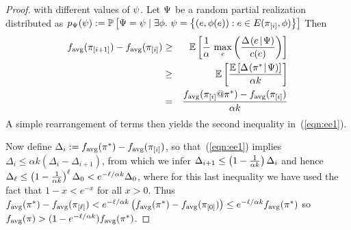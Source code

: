\begin{proof}
with different values of ${\color{black}{\ensuremath{\psi}}}$.
%
Let ${\color{black}{\ensuremath{\Psi}}}$ be a random partial realization distributed as 
${\color{black}{\ensuremath{p_{{\color{black}{\ensuremath{\Psi}}}}\! \left( {{\color{black}{\ensuremath{\psi}}}} \right) }}} := \mathbb{P}\left[{\color{black}{\ensuremath{\Psi}}} = {\color{black}{\ensuremath{\psi}}} \mid \exists {\color{black}{\ensuremath{\phi}}}.\ {\color{black}{\ensuremath{\psi}}} = \left\{(e, {\color{black}{\ensuremath{\phi}}}(e)) : e \in E({ \pi_{[{i}]} }, {{\color{black}{\ensuremath{\phi}}}})\right\}\right] $
%
%
Then 
%
\begin{eqnarray*}
  f_{\text{avg}}( \pi_{[{i+1}]} ) -  f_{\text{avg}}( \pi_{[{i}]} ) & \ge & \mathbb{E}\left[ \frac{1}{\alpha}\,\max_{e}
 \left( {\frac{\Delta \hspace{-0.3mm} \left( { {e}\! \mid \! {{\color{black}{\ensuremath{\Psi}}}} } \right)  }{c(e)}} \right)  \right] \\
 &  \ge & \mathbb{E}\left[
\frac{\mathbb{E}\left[\Delta \hspace{-0.3mm} \left( { {\pi^*}\! \mid \! {{\color{black}{\ensuremath{\Psi}}}} } \right)  \right]}{\alpha k} \right]\\
  & = & \frac{ f_{\text{avg}}(
    { \pi_{[{i}]} }@{\pi^*})  -
    f_{\text{avg}}( \pi_{[{i}]} )} {\alpha k} 
\end{eqnarray*}
%
%
%
%
%
%
%
%
%
%
%
%
%
%
%
\noindent
A simple rearrangement of terms then yields the second inequality in~(\ref{eqn:ee1}).

%
%
%
%
%
%
%




Now define $\Delta_i := f_{\text{avg}}(\pi^*) - f_{\text{avg}}( \pi_{[{i}]} )$,
so that~(\ref{eqn:ee1}) implies $\Delta_i \le \alpha k(\Delta_i
  - \Delta_{i+1})$, from which we infer
  $\Delta_{i+1} \le  \left( {1-\frac{1}{\alpha k}} \right) \Delta_{i}$ and hence 
$\Delta_{\ell} \le  \left( {1 - \frac{1}{\alpha k}} \right) ^{\ell} \Delta_0 <
e^{-\ell/\alpha k} \Delta_0$, where for this last inequality we have used
the fact that $1 - x < e^{-x}$ for all
$x > 0$.
Thus 
$f_{\text{avg}}(\pi^*) - f_{\text{avg}}( \pi_{[{\ell}]} ) < e^{-\ell/\alpha k}  \left( {f_{\text{avg}}(\pi^*) -
  f_{\text{avg}}( \pi_{[{0}]} )} \right)  \le e^{-\ell/\alpha k} f_{\text{avg}}(\pi^*)$ so
$f_{\text{avg}}(\pi) > (1-e^{-\ell/\alpha k})f_{\text{avg}}(\pi^*)$.


\end{proof}
